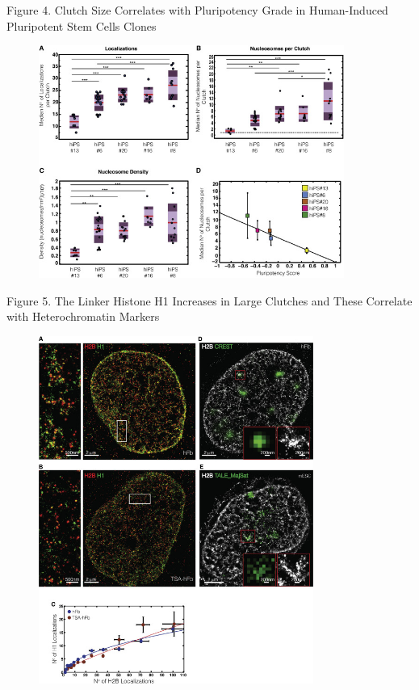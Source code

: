 \documentclass{beamer}			%
\begin{document}
\begin{frame}{Figure 4. Clutch Size Correlates with Pluripotency Grade in Human-Induced Pluripotent Stem Cells Clones}
\begin{figure}
\includegraphics[width=10cm]{Figure-4.jpg}
\end{figure}
\end{frame}

\begin{frame}{Figure 5. The Linker Histone H1 Increases in Large Clutches and These Correlate with Heterochromatin Markers}
\begin{figure}
\includegraphics[width=9cm]{Figure-5.jpg}
\end{figure}
\end{frame}
\end{document}
